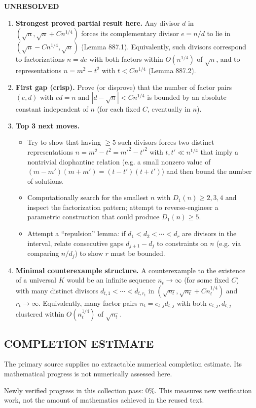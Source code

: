 \noindent \textbf{UNRESOLVED}
\begin{enumerate}
\item[(i)] \textbf{Strongest proved partial result here.} Any divisor $d$ in $(\sqrt n,\sqrt n+Cn^{1/4})$ forces its complementary divisor $e=n/d$ to lie in $(\sqrt n-Cn^{1/4},\sqrt n)$ (Lemma 887.1). Equivalently, such divisors correspond to factorizations $n=de$ with both factors within $O(n^{1/4})$ of $\sqrt n$, and to representations $n=m^2-t^2$ with $t<Cn^{1/4}$ (Lemma 887.2).
\item[(ii)] \textbf{First gap (crisp).} Prove (or disprove) that the number of factor pairs $(e,d)$ with $ed=n$ and $|d-\sqrt n|<Cn^{1/4}$ is bounded by an absolute constant independent of $n$ (for each fixed $C$, eventually in $n$).
\item[(iii)] \textbf{Top 3 next moves.}
  \begin{itemize}
  \item Try to show that having $\ge 5$ such divisors forces two distinct representations $n=m^2-t^2=m'^2-t'^2$ with $t,t'\ll n^{1/4}$ that imply a nontrivial diophantine relation (e.g. a small nonzero value of $(m-m')(m+m')=(t-t')(t+t')$) and then bound the number of solutions.
  \item Computationally search for the smallest $n$ with $D_1(n)\ge 2,3,4$ and inspect the factorization pattern; attempt to reverse-engineer a parametric construction that could produce $D_1(n)\ge 5$.
  \item Attempt a ``repulsion'' lemma: if $d_1<d_2<\cdots<d_r$ are divisors in the interval, relate consecutive gaps $d_{j+1}-d_j$ to constraints on $n$ (e.g. via comparing $n/d_j$) to show $r$ must be bounded.
  \end{itemize}
\item[(iv)] \textbf{Minimal counterexample structure.} A counterexample to the existence of a universal $K$ would be an infinite sequence $n_t\to\infty$ (for some fixed $C$) with many distinct divisors $d_{t,1}<\cdots<d_{t,r_t}$ in $(\sqrt{n_t},\sqrt{n_t}+Cn_t^{1/4})$ and $r_t\to\infty$. Equivalently, many factor pairs $n_t=e_{t,j}d_{t,j}$ with both $e_{t,j},d_{t,j}$ clustered within $O(n_t^{1/4})$ of $\sqrt{n_t}$.
\end{enumerate}




\subsection*{COMPLETION ESTIMATE}
The primary source supplies no extractable numerical completion estimate. Its mathematical progress is not numerically assessed here.

Newly verified progress in this collection pass: $0\%$. This measures new verification work, not the amount of mathematics achieved in the reused text.
